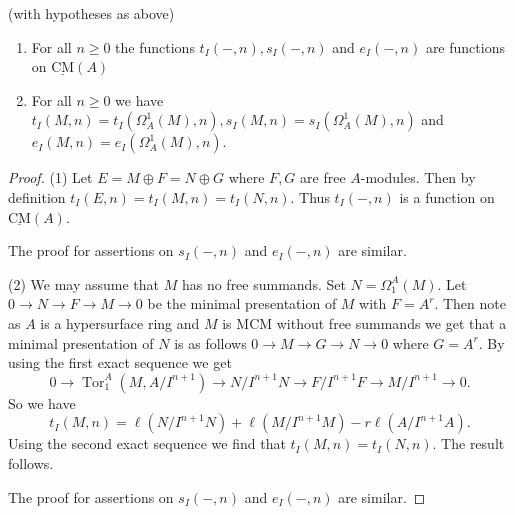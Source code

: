 \documentclass[10pt,a4paper]{amsart}
\newcommand{\CMS}{\operatorname{\underline{CM}}}
\newcommand{\Tor}{\operatorname{Tor}}
\newcommand{\rt}{\rightarrow}
\begin{document}
\begin{lemma}\label{basic}
(with hypotheses as above)
\begin{enumerate}[\rm (1)]
  \item For all $n \geq 0$  the functions $t_I(-,n), s_I(-,n)$ and $e_I(-,n)$ are functions on $\CMS(A)$
  \item For all $n \geq 0$ we have $t_I(M,n) = t_I(\Omega^1_A(M),n), s_I(M,n) = s_I(\Omega^1_A(M),n)$ and $e_I(M,n) = e_I(\Omega^1_A(M),n)$.
\end{enumerate}
\end{lemma}

\begin{proof}
(1) Let $E = M \oplus F = N \oplus G$ where $F, G$ are free $A$-modules. Then by definition
$t_I(E, n) = t_I(M,n) = t_I(N,n)$. Thus $t_I(-, n)$ is a function on $\CMS(A)$.

 The proof for assertions on $s_I(-, n)$ and $e_I(-, n)$ are similar.

(2) We may assume that $M$ has no free summands. Set $N = \Omega^A_1(M)$.  Let $ 0 \rt N  \rt F \rt M \rt 0$ be the minimal presentation of $M$ with $F = A^r$. Then note as $A$ is a hypersurface ring and $M$ is MCM without free summands we get that a minimal presentation of $N$ is as follows $0 \rt M \rt G \rt N \rt 0$ where $G = A^r$.
By using the first exact sequence we get
\[
0 \rt \Tor^A_1(M, A/I^{n+1}) \rt N/I^{n+1}N \rt F/I^{n+1}F \rt M/I^{n+1} \rt 0.
\]
So we have
\[
t_I(M,n) = \ell(N/I^{n+1}N) + \ell(M/I^{n+1}M) - r\ell(A/I^{n+1}A).
\]
Using the second exact sequence we find that $t_I(M,n) = t_I(N,n)$. The result follows.

The proof for assertions on $s_I(-, n)$ and $e_I(-, n)$ are similar.
\end{proof}
\end{document}
